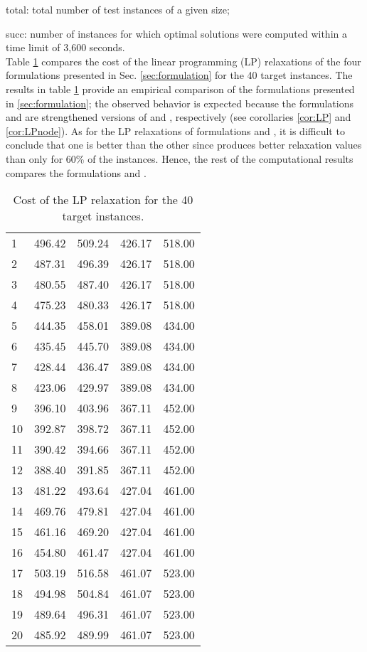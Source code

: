 \documentclass[letterpaper, 10pt, conference]{ieeeconf}
\begin{document}
\noindent total: total number of test instances of a given size;

\noindent succ: number of instances for which optimal solutions were computed within a time limit of 3,600 seconds.  \\

\noindent Table \ref{tab:1} compares the cost of the linear programming (LP) relaxations of the four formulations presented in Sec. \ref{sec:formulation} for the 40 target instances.  The results in table \ref{tab:1} provide an empirical comparison of the formulations presented in \ref{sec:formulation}; the observed behavior is expected because the formulations  and  are strengthened versions of  and , respectively (see corollaries \ref{cor:LP} and \ref{cor:LPnode}). As for the LP relaxations of formulations  and , it is difficult to conclude that one is better than the other since  produces better relaxation values than  only for 60\% of the instances. Hence, the rest of the computational results compares the formulations  and .  

\begin{table}
\centering
\caption{Cost of the LP relaxation for the 40 target instances.}
\label{tab:1}
\begin{tabular}{lrrrr} 
\toprule 
 &  &  &  &  \\ 
\midrule 
1 & 496.42 & 509.24 & 426.17 & 518.00 \\
2 &	487.31 & 496.39 & 426.17 & 518.00 \\
3 &	480.55 & 487.40 & 426.17 & 518.00 \\ 
4 &	475.23 & 480.33 & 426.17 & 518.00 \\
5 &	444.35 & 458.01 & 389.08 & 434.00 \\ 
6 &	435.45 & 445.70 & 389.08 & 434.00 \\ 
7 &	428.44 & 436.47 & 389.08 & 434.00 \\
8 &	423.06 & 429.97 & 389.08 & 434.00 \\ 
9 &	396.10 & 403.96 & 367.11 & 452.00 \\ 
10 & 392.87 & 398.72 & 367.11 & 452.00 \\
11 & 390.42 & 394.66 & 367.11 & 452.00 \\
12 & 388.40 & 391.85 & 367.11 & 452.00 \\ 
13 & 481.22 & 493.64 & 427.04 & 461.00 \\
14 & 469.76 & 479.81 & 427.04 & 461.00 \\
15 & 461.16 & 469.20 & 427.04 & 461.00 \\
16 & 454.80 & 461.47 & 427.04 & 461.00 \\
17 & 503.19 & 516.58 & 461.07 & 523.00 \\
18 & 494.98 & 504.84 & 461.07 & 523.00 \\
19 & 489.64 & 496.31 & 461.07 & 523.00 \\ 
20 & 485.92 & 489.99 & 461.07 & 523.00 \\
\bottomrule 
\end{tabular} 
\end{table}
\end{document}
